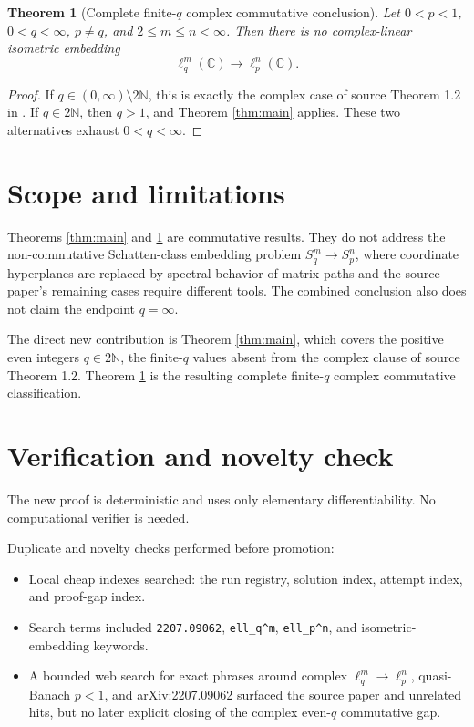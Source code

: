 \documentclass[11pt]{article}
\newtheorem{theorem}{Theorem}
\newcommand{\C}{\mathbb C}
\newcommand{\N}{\mathbb N}
\begin{document}
\begin{theorem}[Complete finite-\(q\) complex commutative conclusion]\label{thm:combined}
Let \(0<p<1\), \(0<q<\infty\), \(p\ne q\), and \(2\le m\le n<\infty\). Then there is no complex-linear isometric embedding
\[
  \ell_q^m(\C)\longrightarrow \ell_p^n(\C).
\]
\end{theorem}

\begin{proof}
If \(q\in(0,\infty)\setminus2\N\), this is exactly the complex case of source Theorem 1.2 in \cite{CHPR}. If \(q\in2\N\), then \(q>1\), and Theorem \ref{thm:main} applies. These two alternatives exhaust \(0<q<\infty\).
\end{proof}

\section{Scope and limitations}

Theorems \ref{thm:main} and \ref{thm:combined} are commutative results. They do not address the non-commutative Schatten-class embedding problem \(S_q^m\to S_p^n\), where coordinate hyperplanes are replaced by spectral behavior of matrix paths and the source paper's remaining cases require different tools. The combined conclusion also does not claim the endpoint \(q=\infty\).

The direct new contribution is Theorem \ref{thm:main}, which covers the positive even integers \(q\in2\N\), the finite-\(q\) values absent from the complex clause of source Theorem 1.2. Theorem \ref{thm:combined} is the resulting complete finite-\(q\) complex commutative classification.

\section{Verification and novelty check}

The new proof is deterministic and uses only elementary differentiability. No computational verifier is needed.

Duplicate and novelty checks performed before promotion:
\begin{itemize}
\item Local cheap indexes searched: the run registry, solution index, attempt index, and proof-gap index.
\item Search terms included \texttt{2207.09062}, \texttt{ell\_q\^{}m}, \texttt{ell\_p\^{}n}, and isometric-embedding keywords.
\item A bounded web search for exact phrases around complex \(\ell_q^m\to\ell_p^n\), quasi-Banach \(p<1\), and arXiv:2207.09062 surfaced the source paper and unrelated hits, but no later explicit closing of the complex even-\(q\) commutative gap.
\end{itemize}
\end{document}
